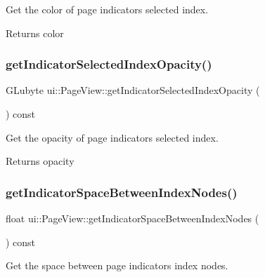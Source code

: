 Get the color of page indicator\textquotesingle{}s selected index. 

\begin{DoxyReturn}{Returns}
color 
\end{DoxyReturn}
\mbox{\label{classui_1_1PageView_a87b0b8b5aead4fe196054cec54de1265}} 
\subsubsection{\texorpdfstring{get\+Indicator\+Selected\+Index\+Opacity()}{getIndicatorSelectedIndexOpacity()}}
{\footnotesize\ttfamily G\+Lubyte ui\+::\+Page\+View\+::get\+Indicator\+Selected\+Index\+Opacity (\begin{DoxyParamCaption}{ }\end{DoxyParamCaption}) const}



Get the opacity of page indicator\textquotesingle{}s selected index. 

\begin{DoxyReturn}{Returns}
opacity 
\end{DoxyReturn}
\mbox{\label{classui_1_1PageView_a5ed4633cd13e1d9be2d195de1e1be077}} 
\subsubsection{\texorpdfstring{get\+Indicator\+Space\+Between\+Index\+Nodes()}{getIndicatorSpaceBetweenIndexNodes()}\hspace{0.1cm}{\footnotesize\ttfamily [1/2]}}
{\footnotesize\ttfamily float ui\+::\+Page\+View\+::get\+Indicator\+Space\+Between\+Index\+Nodes (\begin{DoxyParamCaption}{ }\end{DoxyParamCaption}) const}



Get the space between page indicator\textquotesingle{}s index nodes. 

